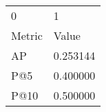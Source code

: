 \begin{tabular}{ll}
0 & 1 \\
Metric & Value \\
AP & 0.253144 \\
P@5 & 0.400000 \\
P@10 & 0.500000 \\
\end{tabular}
